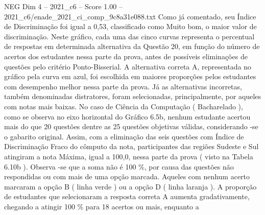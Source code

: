 \begin{textsample}{NEG Dim 4 – 2021\_c6 – Score 1.00 – 2021\_c6/enade\_2021\_ci\_comp\_9c8a31e088.txt}
Como já comentado, seu Índice de Discriminação foi igual a 0,53, classificado como Muito bom, o maior valor de discriminação.
Neste gráfico, cada uma das cinco curvas representa o percentual de respostas em determinada alternativa da Questão 20, em função do número de acertos dos estudantes nessa parte da prova, antes de possíveis eliminações de questões pelo critério Ponto-Bisserial.
A alternativa correta A, representada no gráfico pela curva em azul, foi escolhida em maiores proporções pelos estudantes com desempenho melhor nessa parte da prova.
Já as alternativas incorretas, também denominadas distratores, foram selecionadas, principalmente, por aqueles com notas mais baixas.
No caso de Ciência da Computação ( Bacharelado ), como se observa no eixo horizontal do Gráfico 6.5b, nenhum estudante acertou mais do que 20 questões dentre as 25 questões objetivas válidas, considerando -se o gabarito original.
Assim, com a eliminação das seis questões com Índice de Discriminação Fraco do cômputo da nota, participantes das regiões Sudeste e Sul atingiram a nota Máxima, igual a 100,0, nessa parte da prova ( visto na Tabela 6.10b ).
Observa -se que a soma não é 100 \%, por causa das questões não respondidas ou com mais de uma opção marcada.
Aqueles com nenhum acerto marcaram a opção B ( linha verde ) ou a opção D ( linha laranja ).
A proporção de estudantes que selecionaram a resposta correta A aumenta gradativamente, chegando a atingir 100 \% para 18 acertos ou mais, enquanto a

\end{textsample}
